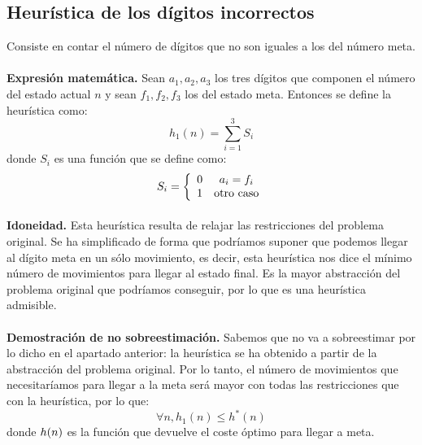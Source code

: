 \documentclass[12pt]{article}
\begin{document}
\subsection{Heurística de los dígitos incorrectos}
Consiste en contar el número de dígitos que no son iguales a los del número meta.
\paragraph{}
\textbf{Expresión matemática.} Sean $a_1,a_2,a_3$ los tres dígitos que componen el número del estado actual $n$ y sean $f_1,f_2,f_3$ los del estado meta. Entonces se define la heurística como:
\begin{equation}
h_1(n)=\sum_{i=1}^{3}S_i
\end{equation}
donde $S_i$ es una función que se define como:
\begin{equation}
S_i=
\left\{
\begin{array}{c c}
0 & a_i=f_i\\
1 & \mbox{otro caso}
\end{array}\right.
\end{equation}
\paragraph{}
\textbf{Idoneidad.} Esta heurística resulta de relajar las restricciones del problema original. Se ha simplificado de forma que podríamos suponer que podemos llegar al dígito meta en un sólo movimiento, es decir, esta heurística nos dice el mínimo número de movimientos para llegar al estado final. Es la mayor abstracción del problema original que podríamos conseguir, por lo que es una heurística admisible.
\paragraph{}
\textbf{Demostración de no sobreestimación.} Sabemos que no va a sobreestimar por lo dicho en el apartado anterior: la heurística se ha obtenido a partir de la abstracción del problema original. Por lo tanto, el número de movimientos que necesitaríamos para llegar a la meta será mayor con todas las restricciones que con la heurística, por lo que:
$$\forall n,h_1(n)\leq h^*(n)$$
donde $h\*(n)$ es la función que devuelve el coste óptimo para llegar a meta.
\end{document}
